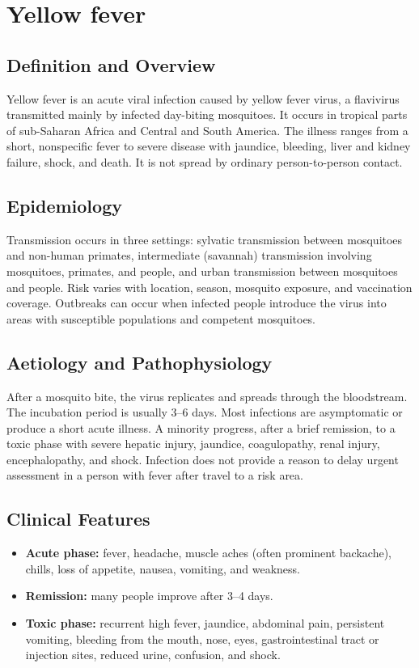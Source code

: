 \chapter{Yellow fever}

\section*{Definition and Overview}
Yellow fever is an acute viral infection caused by yellow fever virus, a flavivirus transmitted mainly by infected day-biting mosquitoes. It occurs in tropical parts of sub-Saharan Africa and Central and South America. The illness ranges from a short, nonspecific fever to severe disease with jaundice, bleeding, liver and kidney failure, shock, and death. It is not spread by ordinary person-to-person contact.

\section*{Epidemiology}
Transmission occurs in three settings: sylvatic transmission between mosquitoes and non-human primates, intermediate (savannah) transmission involving mosquitoes, primates, and people, and urban transmission between mosquitoes and people. Risk varies with location, season, mosquito exposure, and vaccination coverage. Outbreaks can occur when infected people introduce the virus into areas with susceptible populations and competent mosquitoes.

\section*{Aetiology and Pathophysiology}
After a mosquito bite, the virus replicates and spreads through the bloodstream. The incubation period is usually 3--6 days. Most infections are asymptomatic or produce a short acute illness. A minority progress, after a brief remission, to a toxic phase with severe hepatic injury, jaundice, coagulopathy, renal injury, encephalopathy, and shock. Infection does not provide a reason to delay urgent assessment in a person with fever after travel to a risk area.

\section*{Clinical Features}
\begin{itemize}
    \item \textbf{Acute phase:} fever, headache, muscle aches (often prominent backache), chills, loss of appetite, nausea, vomiting, and weakness.
    \item \textbf{Remission:} many people improve after 3--4 days.
    \item \textbf{Toxic phase:} recurrent high fever, jaundice, abdominal pain, persistent vomiting, bleeding from the mouth, nose, eyes, gastrointestinal tract or injection sites, reduced urine, confusion, and shock.
\end{itemize}

